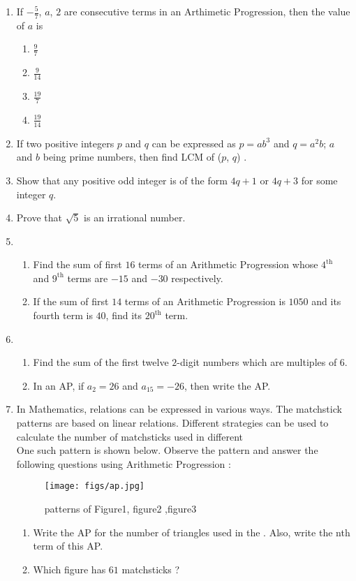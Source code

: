\begin{enumerate}
    \item If $-\frac{5}{7}$, $a$, $2$ are consecutive terms in an Arthimetic Progression, then the value of $a$ is 
    \begin{enumerate}
        \item $\frac{9}{7}$
         \item $\frac{9}{14}$
          \item $\frac{19}{7}$
           \item $\frac{19}{14}$
    \end{enumerate}
    \item If two positive integers $p$ and $q$ can be expressed as $p = ab^3$ and $q = a^2b$; 
$a$ and $b$ being prime numbers, then find LCM of ($p$, $q$) . 

    \item Show that any positive odd integer is of the form $4q + 1$ or $4q + 3$ for some integer $q$. 
    \item Prove that $\sqrt{5}$ is an irrational number.
    \item
    \begin{enumerate}
    \item Find the sum of first $16$ terms of an Arithmetic Progression whose $4^{\text{th}}$ and $9^{\text{th}}$ terms are $-15$ and $-30$ respectively.
    
        \item If the sum of first $14$ terms of an Arithmetic Progression is $1050$ and its fourth term is $40$, find its $20^{\text{th}}$ term.
    \end{enumerate}

    \item 
    \begin{enumerate}
        \item Find the sum of the first twelve $2$-digit numbers which are 
multiples of $6$.

        \item In an AP, if $a_2=26$ and $a _ {15} = -26$, then write the AP.
        \end{enumerate}
        \item In Mathematics, relations can be expressed in various ways. The 
matchstick patterns are based on linear relations. Different strategies 
can be used to calculate the number of matchsticks used in different 
 \\One such pattern is shown below. Observe the pattern and answer the 
following questions using Arithmetic Progression :
\begin{figure}[H]
    \centering
	\texttt{[image: figs/ap.jpg]}
	\caption{patterns of Figure1, figure2 ,figure3}
    \label{fig:ap}
\end{figure}
    \begin{enumerate}
	    \item Write the AP for the number of triangles used in the . Also, 
write the nth term of this AP.
\item Which figure has $61$ matchsticks ? 
    \end{enumerate} 


\end{enumerate}
